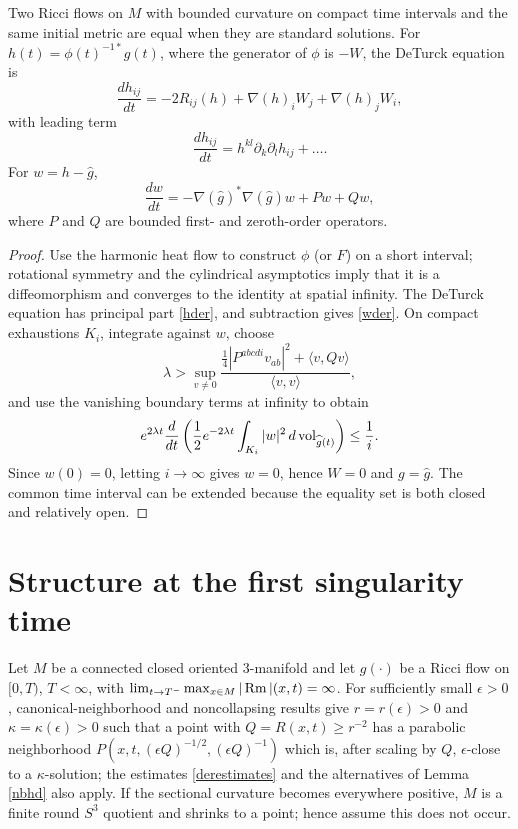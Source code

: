 Two Ricci flows on $M$ with bounded curvature on compact time intervals and the
same initial metric are equal when they are standard solutions. For
$h(t)=\phi(t)^{-1*}g(t)$, where the generator of $\phi$ is $-W$, the
DeTurck equation is
\begin{equation} \label{heqn}
\frac{dh_{ij}}{dt}=-2R_{ij}(h)+\nabla(h)_iW_j+\nabla(h)_jW_i,
\end{equation}
with leading term
\begin{equation} \label{hder}
\frac{dh_{ij}}{dt}=h^{kl}\partial_k\partial_lh_{ij}+\ldots.
\end{equation}
For $w=h-\widehat g$,
\begin{equation} \label{wder}
\frac{dw}{dt}=-\nabla(\widehat g)^*\nabla(\widehat g)w+Pw+Qw,
\end{equation}
where $P$ and $Q$ are bounded first- and zeroth-order operators.
\begin{proof}
\sketch Use the harmonic heat flow to construct $\phi$ (or $F$) on a short
interval; rotational symmetry and the cylindrical asymptotics imply that it is
a diffeomorphism and converges to the identity at spatial infinity. The
DeTurck equation has principal part \eqref{hder}, and subtraction gives
\eqref{wder}. On compact exhaustions $K_i$, integrate against $w$, choose
\begin{equation}
\lambda>\sup_{v\ne0}\frac{\frac14|P^{abcdi}v_{ab}|^2+\langle v,Qv\rangle}{\langle v,v\rangle},
\end{equation}
and use the vanishing boundary terms at infinity to obtain
\begin{equation}
e^{2\lambda t}\frac{d}{dt}\left(\frac12e^{-2\lambda t}\int_{K_i}|w|^2\,d\operatorname{vol}_{\widehat g(t)}\right)\leq\frac1i.
\end{equation}
Since $w(0)=0$, letting $i\to\infty$ gives $w=0$, hence $W=0$ and
$g=\widehat g$. The common time interval can be extended because the equality
set is both closed and relatively open.
\end{proof}

\section{Structure at the first singularity time}
 \label{II.3}

Let $M$ be a connected closed oriented $3$-manifold and let $g(\cdot)$ be a
Ricci flow on $[0,T)$, $T<\infty$, with
$\lim_{t\to T^-}\max_{x\in M}|\operatorname{Rm}|(x,t)=\infty$. For sufficiently small
$\epsilon>0$, canonical-neighborhood and noncollapsing results give
$r=r(\epsilon)>0$ and $\kappa=\kappa(\epsilon)>0$ such that a point with
$Q=R(x,t)\geq r^{-2}$ has a parabolic neighborhood
$P(x,t,(\epsilon Q)^{-1/2},(\epsilon Q)^{-1})$ which is, after scaling by
$Q$, $\epsilon$-close to a $\kappa$-solution; the estimates
\eqref{derestimates} and the alternatives of Lemma \ref{nbhd} also apply.
If the sectional curvature becomes everywhere positive, $M$ is a finite round
$S^3$ quotient and shrinks to a point; hence assume this does not occur.

